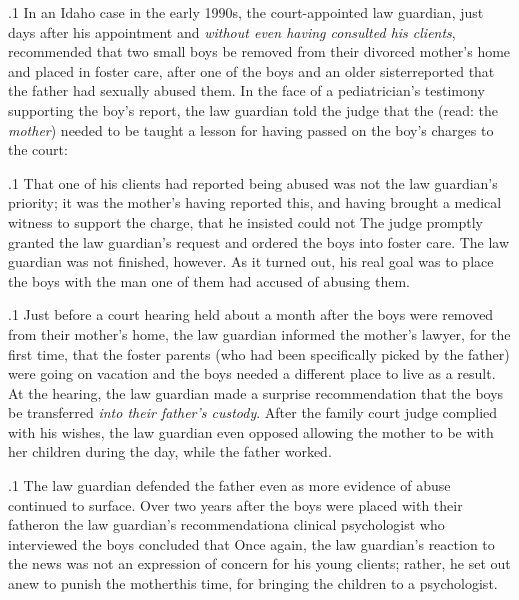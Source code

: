\documentclass[11pt, twoside]{article}
\begin{document}
{\p.1{%
In an Idaho case in the early 1990s, the court-appointed law guardian,
just days after his appointment and \textit{without even having consulted his
clients}, recommended that two small boys be removed from their
divorced mother’s home and placed in foster care, after one of the boys\mdash{}
and an older sister\mdash{}reported that the father had sexually abused them.
In the face of a pediatrician’s testimony supporting the boy’s report, the
law guardian told the judge that the  (read: the \textit{mother}) needed
to be taught a lesson for having passed on the boy’s charges to the court:
}%

\p.1{%
That one of his clients had reported being abused was not the law
guardian’s priority; it was the mother’s having reported this, and having brought a medical witness to support the charge, that he insisted
could not  The judge promptly granted the
law guardian’s request and ordered the boys into foster care. The law
guardian was not finished, however. As it turned out, his real goal was
to place the boys with the man one of them had accused of abusing them.
}%

\p.1{%
Just before a court hearing held about a month after the boys were
removed from their mother’s home, the law guardian informed the
mother’s lawyer, for the first time, that the foster parents (who had
been specifically picked by the father) were going on vacation and the
boys needed a different place to live as a result. At the hearing, the law
guardian made a surprise recommendation that the boys be transferred
\textit{into their father’s custody}. After the family court judge complied with
his wishes, the law guardian even opposed allowing the mother to be
with her children during the day, while the father worked.
}%

\p.1{%
The law guardian defended the father even as more evidence of abuse
continued to surface. Over two years after the boys were placed with
their father\mdash{}on the law guardian’s recommendation\mdash{}a clinical psychologist who interviewed the boys concluded that  Once again, the law guardian’s reaction
to the news was not an expression of concern for his young clients;
rather, he set out anew to punish the mother\mdash{}this time, for bringing
the children to a psychologist.
}%

}
\end{document}
